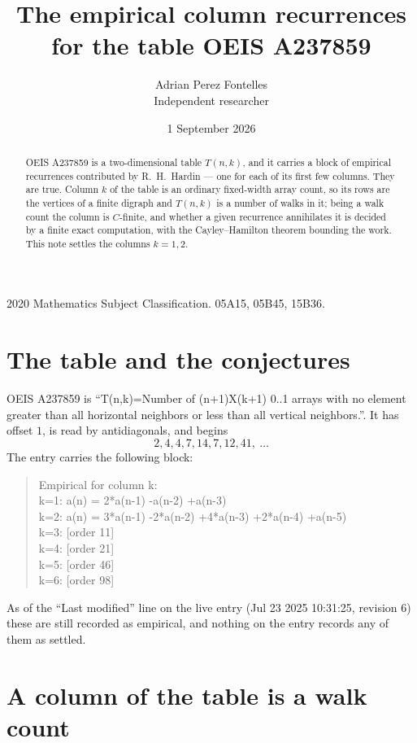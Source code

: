 \documentclass[11pt,a4paper]{article}
\title{The empirical column recurrences for the table OEIS A237859}
\author{Adrian Perez Fontelles\\ \small Independent researcher}
\date{1 September 2026}
\theoremstyle{plain}
\theoremstyle{definition}
\begin{document}
\maketitle

\begin{abstract}
OEIS A237859 is a two-dimensional table $T(n,k)$, and it carries a block of empirical
recurrences contributed by R.~H.~Hardin --- one for each of its first few columns. They are
true. Column $k$ of the table is an ordinary fixed-width array count, so its rows are the
vertices of a finite digraph and $T(n,k)$ is a number of walks in it; being a walk count the
column is $C$-finite, and whether a given recurrence annihilates it is decided by a finite
exact computation, with the Cayley--Hamilton theorem bounding the work. This note settles the columns $k=1, 2$.
\end{abstract}

\noindent\small 2020 Mathematics Subject Classification. 05A15, 05B45, 15B36.\normalsize

\section{The table and the conjectures}

OEIS A237859 is ``T(n,k)=Number of (n+1)X(k+1) 0..1 arrays with no element greater than all horizontal neighbors or less than all vertical neighbors.''. It has offset $1$, is
read by antidiagonals, and begins
\[
2, 4, 4, 7, 14, 7, 12, 41,\ \dots
\]
The entry carries the following block:
\begin{quote}\small
Empirical for column k:\\
k=1: a(n) = 2*a(n-1) -a(n-2) +a(n-3)\\
k=2: a(n) = 3*a(n-1) -2*a(n-2) +4*a(n-3) +2*a(n-4) +a(n-5)\\
k=3: [order 11]\\
k=4: [order 21]\\
k=5: [order 46]\\
k=6: [order 98]\\
\end{quote}
As of the ``Last modified'' line on the live entry (Jul 23 2025 10:31:25, revision 6) these are still
recorded as empirical, and nothing on the entry records any of them as settled.

\section{A column of the table is a walk count}
\end{document}
